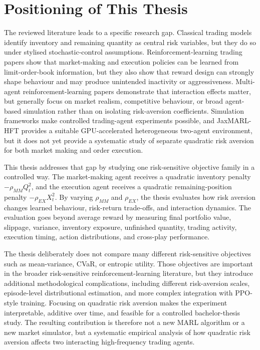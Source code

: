 \documentclass[oneside]{uva-inf-bachelor-thesis}
\begin{document}
\section{Positioning of This Thesis}

The reviewed literature leads to a specific research gap. Classical trading models identify inventory and remaining quantity as central risk variables, but they do so under stylised stochastic-control assumptions. Reinforcement-learning trading papers show that market-making and execution policies can be learned from limit-order-book information, but they also show that reward design can strongly shape behaviour and may produce unintended inactivity or aggressiveness. Multi-agent reinforcement-learning papers demonstrate that interaction effects matter, but generally focus on market realism, competitive behaviour, or broad agent-based simulation rather than on isolating risk-aversion coefficients. Simulation frameworks make controlled trading-agent experiments possible, and JaxMARL-HFT provides a suitable GPU-accelerated heterogeneous two-agent environment, but it does not yet provide a systematic study of separate quadratic risk aversion for both market making and order execution.

This thesis addresses that gap by studying one risk-sensitive objective family in a controlled way. The market-making agent receives a quadratic inventory penalty \(-\rho_{MM}Q_t^2\), and the execution agent receives a quadratic remaining-position penalty \(-\rho_{EX}X_t^2\). By varying \(\rho_{MM}\) and \(\rho_{EX}\), the thesis evaluates how risk aversion changes learned behaviour, risk-return trade-offs, and interaction dynamics. The evaluation goes beyond average reward by measuring final portfolio value, slippage, variance, inventory exposure, unfinished quantity, trading activity, execution timing, action distributions, and cross-play performance.

The thesis deliberately does not compare many different risk-sensitive objectives such as mean-variance, CVaR, or entropic utility. Those objectives are important in the broader risk-sensitive reinforcement-learning literature, but they introduce additional methodological complications, including different risk-aversion scales, episode-level distributional estimation, and more complex integration with PPO-style training. Focusing on quadratic risk aversion makes the experiment interpretable, additive over time, and feasible for a controlled bachelor-thesis study. The resulting contribution is therefore not a new MARL algorithm or a new market simulator, but a systematic empirical analysis of how quadratic risk aversion affects two interacting high-frequency trading agents.
\end{document}
